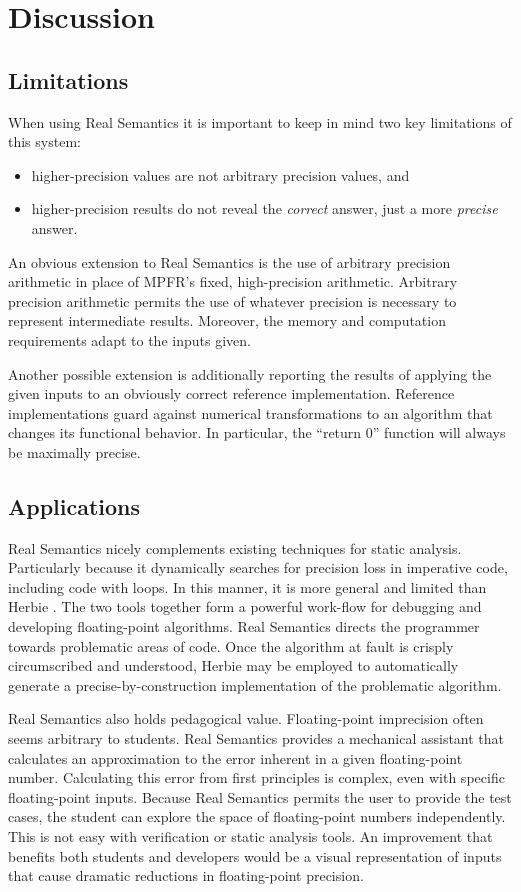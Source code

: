 \section{Discussion}

\subsection{Limitations}

When using Real Semantics it is important to keep in mind two key limitations of this system:

\begin{itemize}
\item higher-precision values are not arbitrary precision values, and
\item higher-precision results do not reveal the \emph{correct} answer, just a more \emph{precise} answer.
\end{itemize}

An obvious extension to Real Semantics is the use of arbitrary precision arithmetic in place of \textsc{MPFR}'s fixed, high-precision arithmetic. Arbitrary precision arithmetic permits the use of whatever precision is necessary to represent intermediate results. Moreover, the memory and computation requirements adapt to the inputs given.

Another possible extension is additionally reporting the results of applying the given inputs to an obviously correct reference implementation. Reference implementations guard against numerical transformations to an algorithm that changes its functional behavior. In particular, the ``return 0'' function will always be maximally precise.
\\
\subsection{Applications}

Real Semantics nicely complements existing techniques for static analysis. Particularly because it dynamically searches for precision loss in imperative code, including code with loops. In this manner, it is more general and limited than Herbie \cite{herbie}. The two tools together form a powerful work-flow for debugging and developing floating-point algorithms. Real Semantics directs the programmer towards problematic areas of code. Once the algorithm at fault is crisply circumscribed and understood, Herbie may be employed to automatically generate a precise-by-construction implementation of the problematic algorithm.

Real Semantics also holds pedagogical value. Floating-point imprecision often seems arbitrary to students. Real Semantics provides a mechanical assistant that calculates an approximation to the error inherent in a given floating-point number. Calculating this error from first principles is complex, even with specific floating-point inputs. Because Real Semantics permits the user to provide the test cases, the student can explore the space of floating-point numbers independently. This is not easy with verification or static analysis tools. An improvement that benefits both students and developers would be a visual representation of inputs that cause dramatic reductions in floating-point precision.
